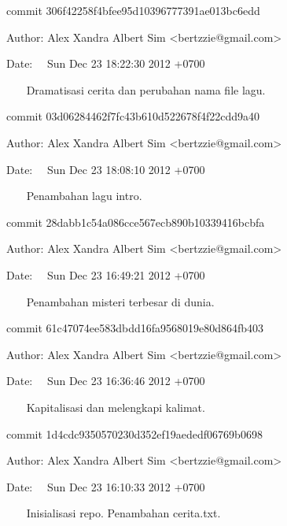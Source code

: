 {\fontsize{10pt}{10pt}\selectfont commit 306f42258f4bfee95d10396777391ae013bc6edd} \par
{\fontsize{10pt}{10pt}\selectfont Author: Alex Xandra Albert Sim <bertzzie@gmail.com>} \par
{\fontsize{10pt}{10pt}\selectfont Date:~~ Sun Dec 23 18:22:30 2012 +0700} \par
\vspace{10pt}
{\fontsize{10pt}{10pt}\selectfont ~~~ Dramatisasi cerita dan perubahan nama file lagu.} \par
\vspace{10pt}
{\fontsize{10pt}{10pt}\selectfont commit 03d06284462f7fc43b610d522678f4f22cdd9a40} \par
{\fontsize{10pt}{10pt}\selectfont Author: Alex Xandra Albert Sim <bertzzie@gmail.com>} \par
{\fontsize{10pt}{10pt}\selectfont Date:~~ Sun Dec 23 18:08:10 2012 +0700} \par
\vspace{10pt}
{\fontsize{10pt}{10pt}\selectfont ~~~ Penambahan lagu intro.} \par
\vspace{10pt}
{\fontsize{10pt}{10pt}\selectfont commit 28dabb1c54a086cce567ecb890b10339416bcbfa} \par
{\fontsize{10pt}{10pt}\selectfont Author: Alex Xandra Albert Sim <bertzzie@gmail.com>} \par
{\fontsize{10pt}{10pt}\selectfont Date:~~ Sun Dec 23 16:49:21 2012 +0700} \par
\vspace{10pt}
{\fontsize{10pt}{10pt}\selectfont ~~~ Penambahan misteri terbesar di dunia.} \par
\vspace{10pt}
{\fontsize{10pt}{10pt}\selectfont commit 61c47074ee583dbdd16fa9568019e80d864fb403} \par
{\fontsize{10pt}{10pt}\selectfont Author: Alex Xandra Albert Sim <bertzzie@gmail.com>} \par
{\fontsize{10pt}{10pt}\selectfont Date:~~ Sun Dec 23 16:36:46 2012 +0700} \par
\vspace{10pt}
{\fontsize{10pt}{10pt}\selectfont ~~~ Kapitalisasi dan melengkapi kalimat.} \par
\vspace{10pt}
{\fontsize{10pt}{10pt}\selectfont commit 1d4cdc9350570230d352ef19aededf06769b0698} \par
{\fontsize{10pt}{10pt}\selectfont Author: Alex Xandra Albert Sim <bertzzie@gmail.com>} \par
{\fontsize{10pt}{10pt}\selectfont Date:~~ Sun Dec 23 16:10:33 2012 +0700} \par
\vspace{10pt}
{\fontsize{10pt}{10pt}\selectfont ~~~ Inisialisasi repo. Penambahan cerita.txt.} \par
\vspace{12pt}
